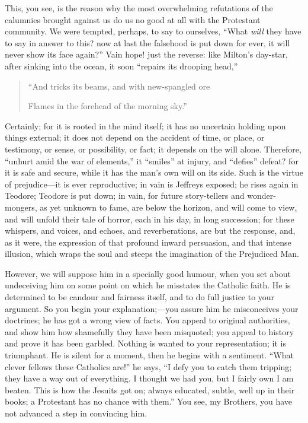 This, you see, is the reason why the most overwhelming
refutations of the calumnies brought against us do us no
good at all with the Protestant community. We were
tempted, perhaps, to say to ourselves, ``What \emph{will}
they have to say in answer to this? now at last the
falsehood is put down for ever, it will never show its
face again?'' Vain hope! just the reverse: like
Milton's day-star, after sinking into the ocean, it soon
``repairs its drooping head,''

\begin{quote}

``And tricks its beams, and with new-spangled ore

Flames in the forehead of the morning sky.''

\end{quote}

Certainly; for it is rooted in the mind itself; it has
no uncertain holding upon things external; it does not
depend on the accident of time, or place, or testimony,
or sense, or possibility, or fact; it depends on the will
alone. Therefore, ``unhurt amid the war of
elements,'' it ``smiles'' at injury, and
``defies'' defeat? for it is safe and secure,
while it has the man's own will on its side. Such is the
virtue of prejudice—it is ever reproductive; in vain
is Jeffreys exposed; he rises again in Teodore; Teodore
is put down; in vain, for future story-tellers and
wonder-mongers, as yet unknown to fame, are below the
horizon, and will come to view, and will unfold their
tale of horror, each in his day, in long succession; for
these whispers, and voices, and echoes, and
reverberations, are but the response, and, as it were,
the expression of that profound inward persuasion, and
that intense illusion, which wraps the soul and steeps
the imagination of the Prejudiced Man.

However, we will suppose him in a specially good
humour, when you set about undeceiving him on some point
on which he misstates the Catholic faith. He is
determined to be candour and fairness itself, and to do
full justice to your argument. So you begin your
explanation;—you assure him he misconceives your
doctrines; he has got a wrong view of facts. You appeal
to original authorities, and show him how shamefully they
have been misquoted; you appeal to history and prove it
has been garbled. Nothing is wanted to your
representation; it is triumphant. He is silent for a
moment, then he begins with a sentiment. ``What
clever fellows these Catholics are!'' he says,
``I defy you to catch them tripping; they have a way
out of everything. I thought we had you, but I fairly own
I am beaten. This is how the Jesuits got on; always
educated, subtle, well up in their books; a Protestant
has no chance with them.'' You see, my Brothers, you
have not advanced a step in convincing him.

